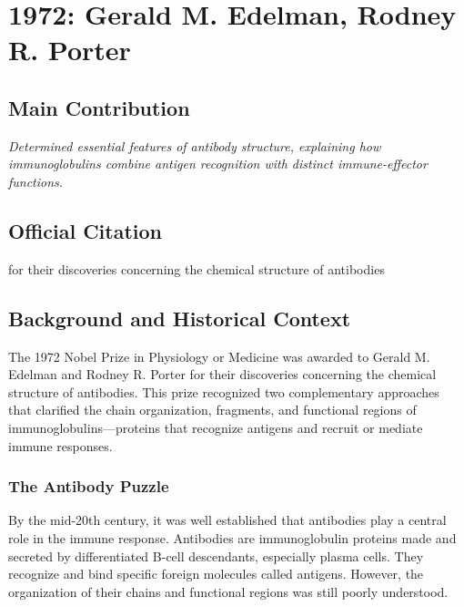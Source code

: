 \chapter[1972 --- Edelman and Porter]{1972: Gerald M. Edelman, Rodney R. Porter}
\label{ch:1972_Edelman}

\section*{Main Contribution}

\textit{Determined essential features of antibody structure, explaining how immunoglobulins combine antigen recognition with distinct immune-effector functions.}\cite{nobel-1972,lecture-1972,lecture-porter-1972}

\section{Official Citation}

for their discoveries concerning the chemical structure of antibodies

\section{Background and Historical Context}

The 1972 Nobel Prize in Physiology or Medicine was awarded to Gerald M. Edelman and Rodney R. Porter for their discoveries concerning the chemical structure of antibodies. This prize recognized two complementary approaches that clarified the chain organization, fragments, and functional regions of immunoglobulins---proteins that recognize antigens and recruit or mediate immune responses.

\subsection{The Antibody Puzzle}

By the mid-20th century, it was well established that antibodies play a central role in the immune response. Antibodies are immunoglobulin proteins made and secreted by differentiated B-cell descendants, especially plasma cells. They recognize and bind specific foreign molecules called antigens. However, the organization of their chains and functional regions was still poorly understood.

